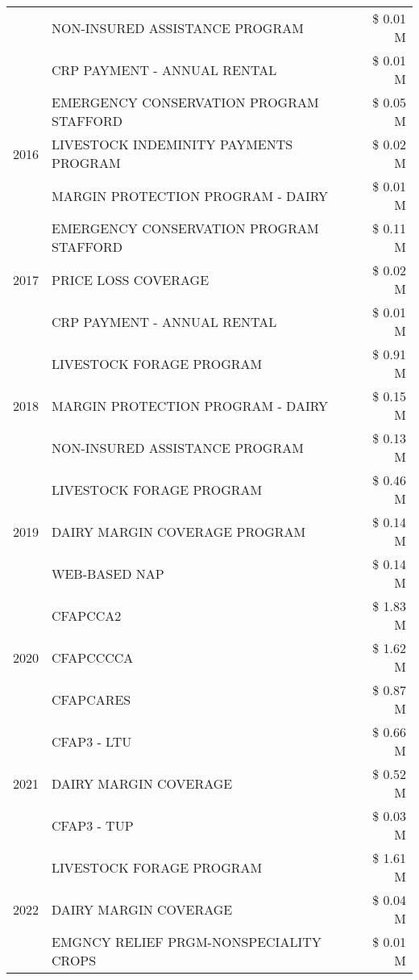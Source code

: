 \begin{tabular}{llr}
 & NON-INSURED ASSISTANCE PROGRAM & \$ 0.01 M \\
 & CRP PAYMENT - ANNUAL RENTAL & \$ 0.01 M \\
\cline{1-3}
\multirow[t]{3}{*}{2016} & EMERGENCY CONSERVATION PROGRAM STAFFORD & \$ 0.05 M \\
 & LIVESTOCK INDEMINITY PAYMENTS PROGRAM & \$ 0.02 M \\
 & MARGIN PROTECTION PROGRAM - DAIRY & \$ 0.01 M \\
\cline{1-3}
\multirow[t]{3}{*}{2017} & EMERGENCY CONSERVATION PROGRAM STAFFORD & \$ 0.11 M \\
 & PRICE LOSS COVERAGE & \$ 0.02 M \\
 & CRP PAYMENT - ANNUAL RENTAL & \$ 0.01 M \\
\cline{1-3}
\multirow[t]{3}{*}{2018} & LIVESTOCK FORAGE PROGRAM & \$ 0.91 M \\
 & MARGIN PROTECTION PROGRAM - DAIRY & \$ 0.15 M \\
 & NON-INSURED ASSISTANCE PROGRAM & \$ 0.13 M \\
\cline{1-3}
\multirow[t]{3}{*}{2019} & LIVESTOCK FORAGE PROGRAM & \$ 0.46 M \\
 & DAIRY MARGIN COVERAGE PROGRAM & \$ 0.14 M \\
 & WEB-BASED NAP & \$ 0.14 M \\
\cline{1-3}
\multirow[t]{3}{*}{2020} & CFAPCCA2 & \$ 1.83 M \\
 & CFAPCCCCA & \$ 1.62 M \\
 & CFAPCARES & \$ 0.87 M \\
\cline{1-3}
\multirow[t]{3}{*}{2021} & CFAP3 - LTU & \$ 0.66 M \\
 & DAIRY MARGIN COVERAGE & \$ 0.52 M \\
 & CFAP3 - TUP & \$ 0.03 M \\
\cline{1-3}
\multirow[t]{3}{*}{2022} & LIVESTOCK FORAGE PROGRAM & \$ 1.61 M \\
 & DAIRY MARGIN COVERAGE & \$ 0.04 M \\
 & EMGNCY RELIEF PRGM-NONSPECIALITY CROPS & \$ 0.01 M \\
\cline{1-3}
\bottomrule
\end{tabular}
